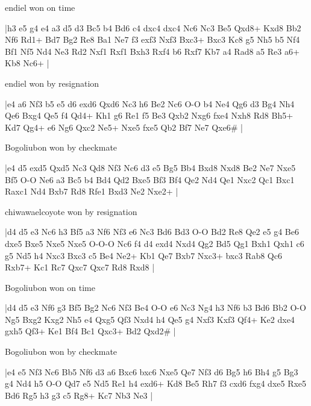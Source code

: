 \showboard

endiel won on time

\makegametitle
|h3 e5 g4 e4 a3 d5 d3 Bc5 b4 Bd6 c4 dxc4 dxc4 Nc6 Nc3 Be5 Qxd8+ Kxd8 Bb2 Nf6 Rd1+ Bd7 Bg2 Re8 Ba1 Ne7 f3 exf3 Nxf3 Bxc3+ Bxc3 Kc8 g5 Nh5 b5 Nf4 Bf1 Nf5 Nd4 Ne3 Rd2 Nxf1 Rxf1 Bxh3 Rxf4 b6 Rxf7 Kb7 a4 Rad8 a5 Re3 a6+ Kb8 Nc6+  |

\showboard

endiel won by resignation

\makegametitle
|e4 a6 Nf3 b5 e5 d6 exd6 Qxd6 Nc3 h6 Be2 Nc6 O-O b4 Ne4 Qg6 d3 Bg4 Nh4 Qe6 Bxg4 Qe5 f4 Qd4+ Kh1 g6 Re1 f5 Be3 Qxb2 Nxg6 fxe4 Nxh8 Rd8 Bh5+ Kd7 Qg4+ e6 Ng6 Qxc2 Ne5+ Nxe5 fxe5 Qb2 Bf7 Ne7 Qxe6\#  |

\showboard

Bogoliubon won by checkmate

\makegametitle
|e4 d5 exd5 Qxd5 Nc3 Qd8 Nf3 Nc6 d3 e5 Bg5 Bb4 Bxd8 Nxd8 Be2 Ne7 Nxe5 Bf5 O-O Ne6 a3 Bc5 b4 Bd4 Qd2 Bxe5 Bf3 Bf4 Qe2 Nd4 Qe1 Nxc2 Qc1 Bxc1 Raxc1 Nd4 Bxb7 Rd8 Rfe1 Bxd3 Ne2 Nxe2+  |

\showboard

chiwawaelcoyote won by resignation

\makegametitle
|d4 d5 e3 Nc6 h3 Bf5 a3 Nf6 Nf3 e6 Nc3 Bd6 Bd3 O-O Bd2 Re8 Qe2 e5 g4 Be6 dxe5 Bxe5 Nxe5 Nxe5 O-O-O Nc6 f4 d4 exd4 Nxd4 Qg2 Bd5 Qg1 Bxh1 Qxh1 c6 g5 Nd5 h4 Nxc3 Bxc3 c5 Be4 Ne2+ Kb1 Qe7 Bxb7 Nxc3+ bxc3 Rab8 Qc6 Rxb7+ Kc1 Rc7 Qxc7 Qxc7 Rd8 Rxd8  |

\showboard

Bogoliubon won on time

\makegametitle
|d4 d5 e3 Nf6 g3 Bf5 Bg2 Nc6 Nf3 Be4 O-O e6 Nc3 Ng4 h3 Nf6 b3 Bd6 Bb2 O-O Ng5 Bxg2 Kxg2 Nh5 e4 Qxg5 Qf3 Nxd4 h4 Qe5 g4 Nxf3 Kxf3 Qf4+ Ke2 dxe4 gxh5 Qf3+ Ke1 Bf4 Bc1 Qxc3+ Bd2 Qxd2\#  |

\showboard

Bogoliubon won by checkmate

\makegametitle
|e4 e5 Nf3 Nc6 Bb5 Nf6 d3 a6 Bxc6 bxc6 Nxe5 Qe7 Nf3 d6 Bg5 h6 Bh4 g5 Bg3 g4 Nd4 h5 O-O Qd7 e5 Nd5 Re1 h4 exd6+ Kd8 Be5 Rh7 f3 cxd6 fxg4 dxe5 Rxe5 Bd6 Rg5 h3 g3 c5 Rg8+ Kc7 Nb3 Ne3  |

